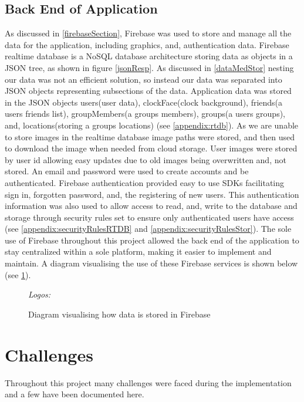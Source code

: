 \subsection{Back End of Application}
As discussed in \ref{firebaseSection}, Firebase was used to store and manage all the data for the application, including graphics, and, authentication data. Firebase realtime database is a NoSQL database architecture storing data as objects in a JSON tree, as shown in figure \ref{jsonResp}. As discussed in \ref{dataMedStor} nesting our data was not an efficient solution, so instead our data was separated into JSON objects representing subsections of the data. Application data was stored in the JSON objects users(user data), clockFace(clock background), friends(a users friends list), groupMembers(a groups members), groups(a users groups), and, locations(storing a groups locations) (see \ref{appendix:rtdb}). As we are unable to store images in the realtime database image paths were stored, and then used to download the image when needed from cloud storage. User images were stored by user id allowing easy updates due to old images being overwritten and, not stored. An email and password were used to create accounts and be authenticated. Firebase authentication provided easy to use SDKs facilitating sign in, forgotten password, and, the registering of new users. This authentication information was also used to allow access to read, and, write to the database and storage through security rules set to ensure only authenticated users have access (see \ref{appendix:securityRulesRTDB} and \ref{appendix:securityRulesStor}). The sole use of Firebase throughout this project allowed the back end of the application to stay centralized within a sole platform, making it easier to implement and maintain. A diagram visualising the use of these Firebase services is shown below (see \ref{fig:firebaseDiag}).
\begin{figure}[!htbp]
    \centering
    \begin{subfigure}[b]{\textwidth}
    \end{subfigure}
    \caption{Diagram visualising how data is stored in Firebase} \small\textit{{Logos: \cite{storImg, rtdbImg, authImg}}}
    \label{fig:firebaseDiag}
\end{figure}
\FloatBarrier
\section{Challenges}
Throughout this project many challenges were faced during the implementation and a few have been documented here.
